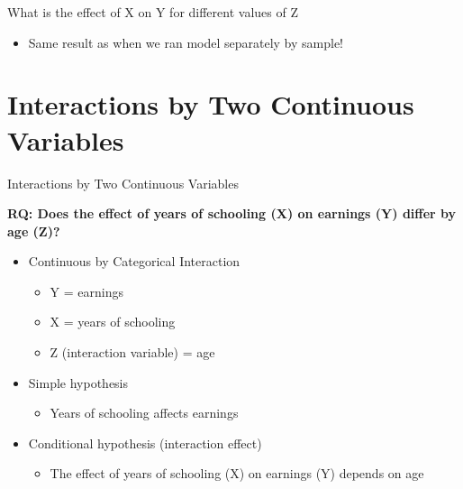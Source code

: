 \documentclass[8pt,ignorenonframetext,dvipsnames]{beamer}
\providecommand{\tightlist}{%
  \setlength{\itemsep}{0pt}\setlength{\parskip}{0pt}}
\renewcommand{\textbf}[1]{{\color{darkgray}\bfseries\fontfamily{Montserrat-TOsF}#1}}
\let\olditem\item
\renewcommand{\item}{%
  \olditem\vspace{4pt}
}
\begin{document}
\begin{frame}{What is the effect of X on Y for different values of Z}
\medskip

\begin{itemize}
\tightlist
\item
  Same result as when we ran model separately by sample!
\end{itemize}

\end{frame}

\hypertarget{interactions-by-two-continuous-variables}{%
\section{Interactions by Two Continuous
Variables}\label{interactions-by-two-continuous-variables}}

\begin{frame}{Interactions by Two Continuous Variables}
\protect\hypertarget{interactions-by-two-continuous-variables-1}{}

\textbf{RQ: Does the effect of years of schooling (X) on earnings (Y)
differ by age (Z)?}

\begin{itemize}
\tightlist
\item
  Continuous by Categorical Interaction

  \begin{itemize}
  \tightlist
  \item
    Y = earnings
  \item
    X = years of schooling
  \item
    Z (interaction variable) = age
  \end{itemize}
\item
  Simple hypothesis

  \begin{itemize}
  \tightlist
  \item
    Years of schooling affects earnings
  \end{itemize}
\item
  Conditional hypothesis (interaction effect)

  \begin{itemize}
  \tightlist
  \item
    The effect of years of schooling (X) on earnings (Y) depends on age
  \end{itemize}
\end{itemize}

\end{frame}
\end{document}
